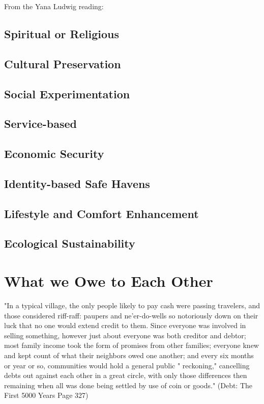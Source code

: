 \documentclass{article}
\begin{document}
From the Yana Ludwig reading:

\subsection{Spiritual or Religious}
\subsection{Cultural Preservation}
\subsection{Social Experimentation}
\subsection{Service-based}
\subsection{Economic Security}
\subsection{Identity-based Safe Havens}
\subsection{Lifestyle and Comfort Enhancement}
\subsection{Ecological Sustainability}


\pagebreak
\section{What we Owe to Each Other}


"In a typical village, the only people likely to pay cash were passing
travelers, and those considered riff-raff: paupers and ne'er-do-wells so
notoriously down on their luck that no one would extend credit to
them. Since everyone was involved in selling something, however just
about everyone was both creditor and debtor; most family income took
the form of promises from other families; everyone knew and kept
count of what their neighbors owed one another; and every six months
or year or so, communities would hold a general public " reckoning,"
cancelling debts out against each other in a great circle, with only those
differences then remaining when all was done being settled by use of
coin or goods." (Debt: The First 5000 Years Page 327)
\end{document}
